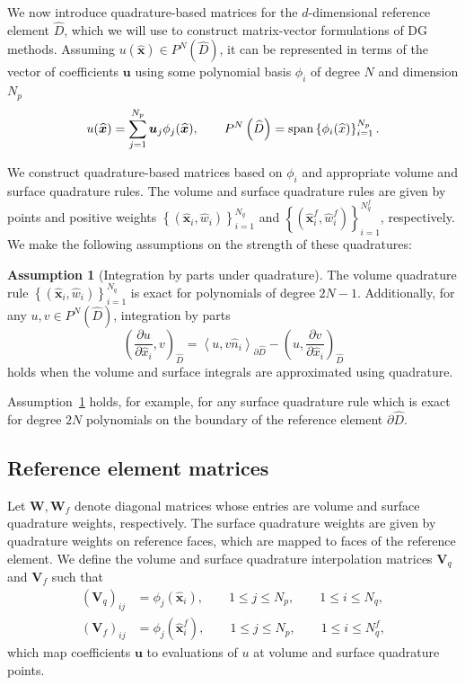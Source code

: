\documentclass[10pt]{amsart}
\theoremstyle{definition}
\theoremstyle{lemma}
\theoremstyle{theorem}
\theoremstyle{assumption}
\newtheorem{assumption}{Assumption}
\renewcommand{\hat}{\widehat}
\newcommand{\pd}[2]{\frac{\partial#1}{\partial#2}}
\newcommand{\LRp}[1]{\left( #1 \right)}
\newcommand{\LRa}[1]{\left\langle #1 \right\rangle}
\newcommand{\LRc}[1]{\left\{ #1 \right\}}
\newcommand{\note}[1]{{\color{blue}{#1}}}
\begin{document}
{We now introduce quadrature-based matrices for the $d$-dimensional reference element $\widehat{D}$, which we will use to construct matrix-vector formulations of DG methods.   Assuming $u(\hat{\bm{x}}) \in P^N\LRp{\widehat{D}}$, it can be represented in terms of the vector of coefficients $\bm{u}$ using some polynomial basis $\phi_i$ of degree $N$ and dimension $N_p$ 
\[
  u(\hat{\bm{x}}) = \sum_{j=1}^{N_p}\bm{u}_j \phi_j(\widehat{\bm{x}}), \qquad P^N\LRp{\widehat{D}} = {\rm span}\LRc{\phi_i(\widehat{x})}_{i=1}^{N_p}.
\]

We construct quadrature-based matrices based on $\phi_i$ and appropriate volume and surface quadrature rules.  The volume and surface quadrature rules are given by points and positive weights $\LRc{(\hat{\bm{x}}_i, \hat{w}_i)}_{i=1}^{N_q}$ and $\LRc{(\hat{\bm{x}}^f_i, \hat{w}^f_i)}_{i=1}^{N^f_q}$, respectively.  We make the following assumptions on the strength of these quadratures: %
\begin{assumption}[Integration by parts under quadrature]
  The volume quadrature rule  $\LRc{(\hat{\bm{x}}_i, \hat{w}_i)}_{i=1}^{N_q}$ is exact for polynomials of degree $2N-1$.  Additionally, 
for any $u, v \in P^N\LRp{\hat{D}}$, integration by parts 
\[
  \LRp{\pd{u}{\hat{x}_i},v}_{\hat{D}} = \LRa{u,v\hat{n}_i}_{\partial \hat{D}} - \LRp{u,\pd{v}{\hat{x}_i}}_{\hat{D}}
\]
holds when the volume and surface integrals are approximated using quadrature.
\label{ass:quad}
\end{assumption}
Assumption~\ref{ass:quad} holds, for example, for any surface quadrature rule which is exact for degree $2N$ polynomials on the boundary of the reference element $\partial \hat{D}$.  


\subsection{Reference element matrices}
\label{sec:matrix}

Let $\bm{W}, \bm{W}_f$ denote diagonal matrices whose entries are volume and surface quadrature weights, respectively.  The surface quadrature weights are given by quadrature weights on reference faces, which are mapped to faces of the reference element.  We define the volume and surface quadrature interpolation matrices $\bm{V}_q$ and $\bm{V}_f$ such that
\begin{align}
\LRp{\bm{V}_q}_{ij} &= \phi_j(\hat{\bm{x}}_i), \qquad 1 \leq j \leq N_p, \qquad 1 \leq i \leq N_q, \nonumber\\
\LRp{\bm{V}_f}_{ij} &= \phi_j(\hat{\bm{x}}^f_i), \qquad 1 \leq j \leq N_p, \qquad 1 \leq i \leq N^f_q,\label{eq:qinterp}
\end{align}
which map coefficients $\bm{u}$ to evaluations of $u$ at volume and surface quadrature points.  

}
\end{document}
